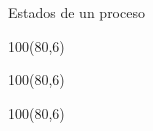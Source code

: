 \documentclass[aspectratio=169]{beamer}
\begin{document}
\begin{frame}[fragile]{Estados de un proceso}
    \begin{textblock}{100}(80,6)  \end{textblock} %
    \begin{textblock}{100}(80,6)  \end{textblock} %
    \begin{textblock}{100}(80,6)  \end{textblock} %
\end{frame}

\end{document}
